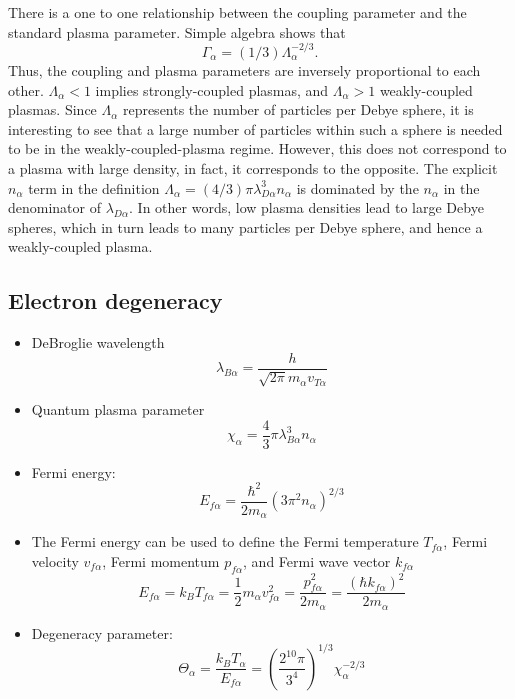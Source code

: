 \documentclass[a4paper,11pt]{report}
\begin{document}
There is a one to one relationship between the coupling parameter and the standard plasma parameter. Simple algebra shows that 
\begin{equation}
    \Gamma_\alpha = (1/3) \Lambda_\alpha^{-2/3}.
\end{equation}
Thus, the coupling and plasma parameters are inversely proportional to each other. $\Lambda_\alpha < 1$ implies strongly-coupled plasmas, and $\Lambda_\alpha > 1$ weakly-coupled plasmas. Since $\Lambda_\alpha$ represents the number of particles per Debye sphere, it is interesting to see that a large number of particles within such a sphere is needed to be in the weakly-coupled-plasma regime. However, this does not correspond to a plasma with large density, in fact, it corresponds to the opposite. The explicit $n_\alpha$ term in the definition $\Lambda_\alpha = (4/3) \pi \lambda^3_{D\alpha} n_\alpha$ is dominated by the $n_\alpha$ in the denominator of $\lambda_{D\alpha}$. In other words, low plasma densities lead to large Debye spheres, which in turn leads to many particles per Debye sphere, and hence a weakly-coupled plasma.

\subsection{Electron degeneracy}

\begin{itemize}
    \item DeBroglie wavelength
    \begin{equation}
        \lambda_{B\alpha} = \dfrac{h}{\sqrt{2 \pi} m_\alpha v_{T\alpha}}
    \end{equation}
    \item Quantum plasma parameter
    \begin{equation}
        \chi_\alpha = \frac{4}{3} \pi \lambda_{B\alpha}^3 n_\alpha
    \end{equation}
    
    \item Fermi energy:
    \begin{equation}
        E_{f\alpha} = \frac{\hbar^2}{2m_\alpha} \left ( 3 \pi^2 n_\alpha \right)^{2/3}
    \end{equation}

    \item The Fermi energy can be used to define the Fermi temperature $T_{f\alpha}$, Fermi velocity $v_{f\alpha}$, Fermi momentum $p_{f\alpha}$, and Fermi wave vector $k_{f\alpha}$
    \begin{equation}
        E_{f\alpha} = k_B T_{f\alpha} = \frac{1}{2} m_\alpha v_{f\alpha}^2  = \frac{p_{f\alpha}^2}{2m_\alpha} = \frac{\left ( \hbar k_{f\alpha} \right ) ^2}{2m_\alpha}
    \end{equation}

    \item Degeneracy parameter:
    \begin{equation}
        \Theta_\alpha = \frac{k_B T_\alpha}{E_{f\alpha}} = \left( \frac{2^{10} \pi}{3^4} \right)^{1/3} \chi_\alpha^{-2/3}
    \end{equation}
\end{itemize}
\end{document}
